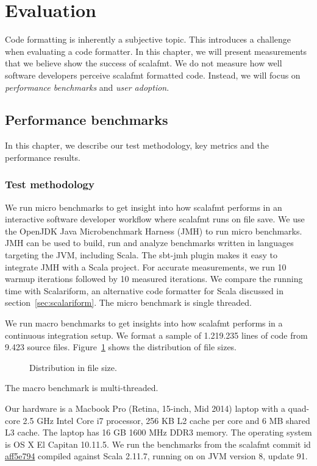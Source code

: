 \section{Evaluation}
Code formatting is inherently a subjective topic.
This introduces a challenge when evaluating a code formatter.
In this chapter, we will present measurements that we believe show the success of scalafmt.
We do not measure how well software developers perceive scalafmt formatted code.
Instead, we will focus on \emph{performance benchmarks} and \emph{user adoption}.

\subsection{Performance benchmarks}
In this chapter, we describe our test methodology, key metrics and the performance results.

\subsubsection{Test methodology}
We run micro benchmarks to get insight into how scalafmt performs in an interactive software developer workflow where scalafmt runs on file save.
We use the OpenJDK Java Microbenchmark Harness (JMH)\autocite{OpenJ38:online} to run micro benchmarks.
JMH can be used to build, run and analyze benchmarks written in languages targeting the JVM, including Scala.
The sbt-jmh\autocite{ktoso84:online} plugin makes it easy to integrate JMH with a Scala project.
For accurate measurements, we run 10 warmup iterations followed by 10 measured iterations.
We compare the running time with Scalariform, an alternative code formatter for Scala discussed in section~\ref{sec:scalariform}.
The micro benchmark is single threaded.

We run macro benchmarks to get insights into how scalafmt performs in a continuous integration setup.
We format a sample of 1.219.235 lines of code from 9.423 source files.
Figure~\ref{fig:macro_sample} shows the distribution of file sizes.
\begin{figure}\label{fig:macro_sample}
  \centering
  
  \caption{Distribution in file size.}
\end{figure}
The macro benchmark is multi-threaded.

Our hardware is a Macbook Pro (Retina, 15-inch, Mid 2014) laptop with a quad-core 2.5 GHz Intel Core i7 processor, 256 KB L2 cache per core and 6 MB shared L3 cache.
The laptop has 16 GB 1600 MHz DDR3 memory.
The operating system is OS X El Capitan 10.11.5.
We run the benchmarks from the scalafmt commit id \href{https://github.com/olafurpg/scalafmt/tree/aff5e794dae4787b08243f8abb87a3ca4d907e40}{aff5e794} compiled against Scala 2.11.7, running on
on JVM version 8, update 91.

